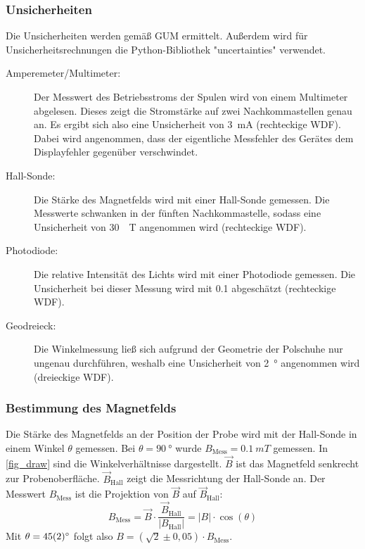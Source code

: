 \documentclass[
	a4paper,
	12pt,
	pagesize,
	ngerman
]{scrartcl}
\begin{document}
	\subsubsection{Unsicherheiten} %
	Die Unsicherheiten werden gemäß GUM ermittelt. 
	Außerdem wird für Unsicherheitsrechnungen die Python-Bibliothek "uncertainties" verwendet.
	\begin{description}
		\item[Amperemeter/Multimeter:] Der Messwert des Betriebsstroms der Spulen wird von einem Multimeter abgelesen. 
			Dieses zeigt die Stromstärke auf zwei Nachkommastellen genau an. 
			Es ergibt sich also eine Unsicherheit von \SI{3}{mA} (rechteckige WDF).
			Dabei wird angenommen, dass der eigentliche Messfehler des Gerätes dem Displayfehler gegenüber verschwindet. 
		\item[Hall-Sonde:]  Die Stärke des Magnetfelds wird mit einer Hall-Sonde gemessen. Die Messwerte schwanken in der fünften Nachkommastelle, sodass eine Unsicherheit von \SI{30}{\mu T} angenommen wird (rechteckige WDF).
		\item[Photodiode:]  Die relative Intensität des Lichts wird mit einer Photodiode gemessen. Die Unsicherheit bei dieser Messung wird mit \SI{0,1}{} abgeschätzt (rechteckige WDF).
		\item[Geodreieck:]  Die Winkelmessung ließ sich aufgrund der Geometrie der Polschuhe nur ungenau durchführen, weshalb eine Unsicherheit von \SI{2}{\degree} angenommen wird (dreieckige WDF).
	\end{description} 

	\subsubsection{Bestimmung des Magnetfelds}
	\label{ss_spule}
	Die Stärke des Magnetfelds an der Position der Probe wird mit der Hall-Sonde in einem Winkel $\theta$ gemessen.
	Bei $\theta=\SI{90}{\degree}$ wurde $B_\text{Mess} = \SI{0,1}{mT}$ gemessen.
	In \cref{fig_draw} sind die Winkelverhältnisse dargestellt. 
	$\vec B$ ist das Magnetfeld senkrecht zur Probenoberfläche. 
	$\vec B_\text{Hall}$ zeigt die Messrichtung der Hall-Sonde an.
	Der Messwert $ B_\text{Mess}$ ist die Projektion von $\vec B$ auf $\vec B_\text{Hall}$:
	\begin{equation}
		B_\text{Mess}  = \vec B \cdot \frac{\vec B_\text{Hall}}{\left| B_\text{Hall} \right|} = \left| B \right| \cdot \cos(\theta)
	\end{equation}
	Mit $\theta=\SI{45\pm 2}{\degree}$ folgt also $B = (\sqrt{2}\pm0,05) \cdot B_\text{Mess}$.
\end{document}
